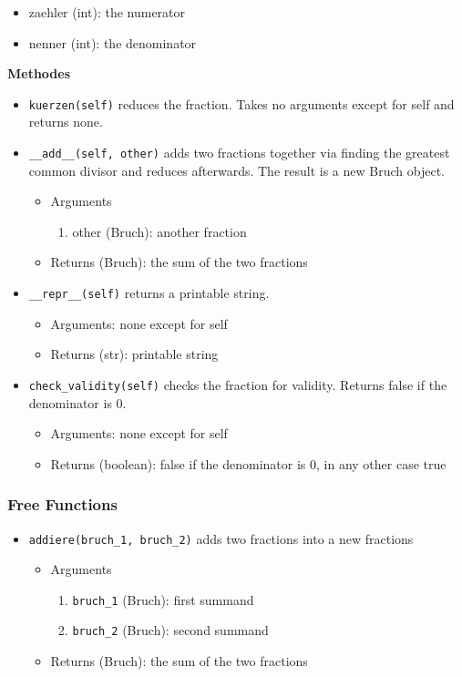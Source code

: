 \documentclass[refman]{scrartcl}
\begin{document}
\begin{itemize}
    \item zaehler (int): the numerator
    \item nenner (int): the denominator
\end{itemize}

\noindent\textbf{Methodes}

\begin{itemize}
    \item \texttt{kuerzen(self)} reduces the fraction. Takes no arguments except for self and returns none.
    \item \texttt{\_\_add\_\_(self, other)} adds two fractions together via finding the greatest common divisor and reduces afterwards. The result is a new Bruch object.
    \begin{itemize}
        \item Arguments
        \begin{enumerate}
            \item other (Bruch): another fraction
        \end{enumerate}
        \item Returns (Bruch): the sum of the two fractions
    \end{itemize}
    \item \texttt{\_\_repr\_\_(self)} returns a printable string.
    \begin{itemize}
        \item Arguments: none except for self
        \item Returns (str): printable string
    \end{itemize}
    \item \texttt{check\_validity(self)} checks the fraction for validity. Returns false if the denominator is \(0\).
    \begin{itemize}
        \item Arguments: none except for self
        \item Returns (boolean): false if the denominator is \(0\), in any other case true
    \end{itemize}
\end{itemize}

\subsubsection{Free Functions}

\begin{itemize}
    \item \texttt{addiere(bruch\_1, bruch\_2)} adds two fractions into a new fractions
    \begin{itemize}
        \item Arguments
        \begin{enumerate}
            \item \texttt{bruch\_1} (Bruch): first summand
            \item \texttt{bruch\_2} (Bruch): second summand
        \end{enumerate}
        \item Returns (Bruch): the sum of the two fractions
    \end{itemize}
\end{itemize}
\end{document}
